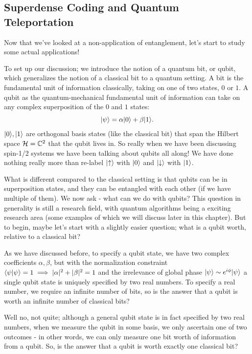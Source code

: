 \subsection{Superdense Coding and Quantum Teleportation}
Now that we've looked at a non-application of entanglement, let's start to study some actual applications!

To set up our discussion; we introduce the notion of a quantum bit, or qubit, which generalizes the notion of a classical bit to a quantum setting. A bit is the fundamental unit of information classically, taking on one of two states, $0$ or $1$. A qubit as the quantum-mechanical fundamental unit of information can take on any complex superposition of the $0$ and $1$ states:
\begin{equation}
    \lvert \psi \rangle = \alpha\lvert 0 \rangle + \beta\lvert 1 \rangle.
\end{equation}
$\lvert 0 \rangle, \lvert 1 \rangle$ are orthogonal basis states (like the classical bit) that span the Hilbert space $\mathcal{H} = \mathbb{C}^2$ that the qubit lives in. So really when we have been discussing spin-1/2 systems we have been talking about qubits all along! We have done nothing really more than re-label $\lvert \uparrow \rangle$ with $\lvert 0 \rangle$ and $\lvert \downarrow \rangle$ with $\lvert 1 \rangle$.  

What is different compared to the classical setting is that qubits can be in superposition states, and they can be entangled with each other (if we have multiple of them). We now ask - what can we do with qubits? This question in generality is still a research field, with quantum algorithms being a exciting research area (some examples of which we will discuss later in this chapter). But to begin, maybe let's start with a slightly easier question; what is a qubit worth, relative to a classical bit?

As we have discussed before, to specify a qubit state, we have two complex coefficients $\alpha, \beta$, but with the normalization constraint $\langle \psi \lvert \psi \rangle = 1 \implies \lvert \alpha \rvert^2 + \lvert \beta \rvert^2 = 1$ and the irrelevance of global phase $\ket{\psi} \sim e^{i\phi}\ket{\psi}$ a single qubit state is uniquely specified by two real numbers. To specify a real number, we require an infinite number of bits, so is the answer that a qubit is worth an infinite number of classical bits?

Well no, not quite; although a general qubit state is in fact specified by two real numbers, when we measure the qubit in some basis, we only ascertain one of two outcomes - in other words, we can only measure one bit worth of information from a qubit. So, is the answer that a qubit is worth exactly one classical bit?

